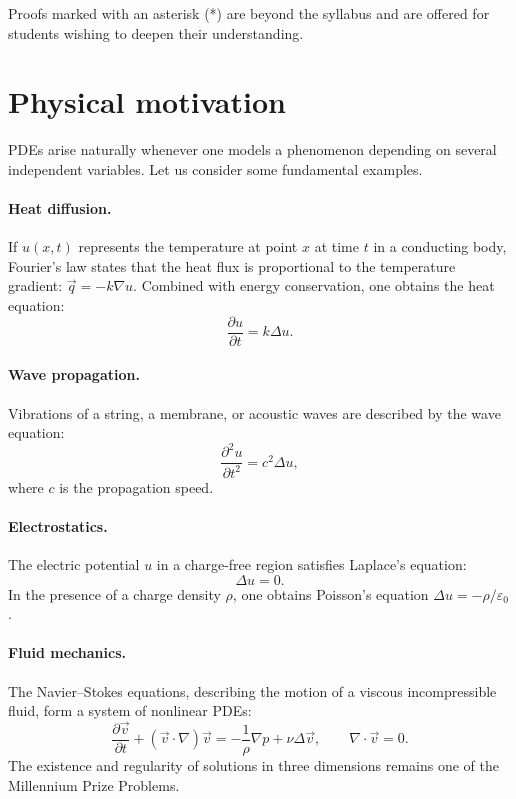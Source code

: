 Proofs marked with an asterisk (*) are beyond the syllabus and are offered
for students wishing to deepen their understanding.

\section*{Physical motivation}

PDEs arise naturally whenever one models a phenomenon depending on several
independent variables. Let us consider some fundamental examples.

\paragraph{Heat diffusion.}
If $u(x,t)$ represents the temperature at point $x$ at time $t$ in a
conducting body, Fourier's law states that the heat flux is proportional to
the temperature gradient: $\vec{q} = -k\nabla u$. Combined with energy
conservation, one obtains the heat equation:
\[
    \frac{\partial u}{\partial t} = k \Delta u.
\]

\paragraph{Wave propagation.}
Vibrations of a string, a membrane, or acoustic waves are described by the
wave equation:
\[
    \frac{\partial^2 u}{\partial t^2} = c^2 \Delta u,
\]
where $c$ is the propagation speed.

\paragraph{Electrostatics.}
The electric potential $u$ in a charge-free region satisfies Laplace's
equation:
\[
    \Delta u = 0.
\]
In the presence of a charge density $\rho$, one obtains Poisson's equation
$\Delta u = -\rho/\varepsilon_0$.

\paragraph{Fluid mechanics.}
The Navier--Stokes equations, describing the motion of a viscous
incompressible fluid, form a system of nonlinear PDEs:
\[
    \frac{\partial \vec{v}}{\partial t} + (\vec{v} \cdot \nabla)\vec{v}
    = -\frac{1}{\rho}\nabla p + \nu \Delta \vec{v}, \qquad
    \nabla \cdot \vec{v} = 0.
\]
The existence and regularity of solutions in three dimensions remains one of
the Millennium Prize Problems.

